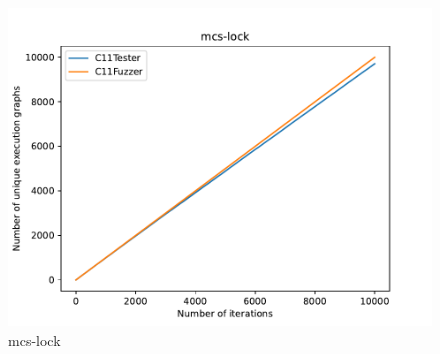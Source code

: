 \begin{figure}[H]
	\begin{minipage}{0.45\textwidth}
		\centering
		\includegraphics[width=\textwidth]{figure/mcs-lock.pdf}
		\caption{mcs-lock}
		\label{cover-plot1-mcs-lock}
	\end{minipage}
	\hfill
	\begin{minipage}{0.45\textwidth}
		\centering
	\end{minipage}



\end{figure}



